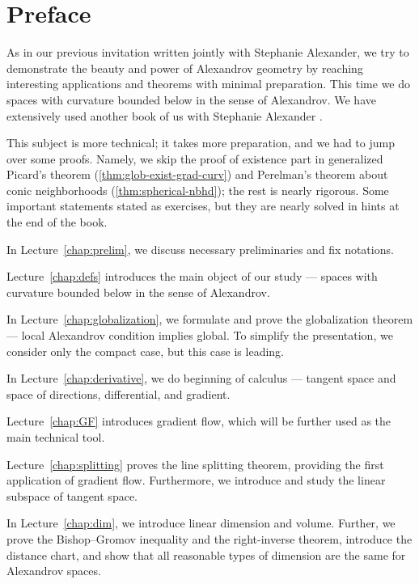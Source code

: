 \chapter*{Preface}

As in our previous invitation \cite{alexander-kapovitch-petrunin-2019} written jointly with Stephanie Alexander,
we try to demonstrate the beauty and power of Alexandrov geometry by reaching interesting applications and theorems with minimal preparation.
This time we do spaces with curvature bounded below in the sense of Alexandrov.
We have extensively used another book of us with Stephanie Alexander \cite{alexander-kapovitch-petrunin2024}.

This subject is more technical; it takes more preparation, and we had to jump over some proofs.
Namely, we skip the proof of existence part in generalized Picard's theorem (\ref{thm:glob-exist-grad-curv})
and Perelman's theorem about conic neighborhoods (\ref{thm:spherical-nbhd});
the rest is nearly rigorous.
Some important statements stated as exercises, but they are nearly solved in hints at the end of the book.

\medskip 

In Lecture~\ref{chap:prelim}, we discuss necessary preliminaries and fix notations.

Lecture~\ref{chap:defs} introduces the main object of our study --- spaces with curvature bounded below in the sense of Alexandrov.

In Lecture~\ref{chap:globalization}, we formulate and prove the globalization theorem --- local Alexandrov condition implies global.
To simplify the presentation, we consider only the compact case, but this case is leading.

In Lecture~\ref{chap:derivative}, we do beginning of calculus --- tangent space and space of directions, differential, and gradient.

Lecture~\ref{chap:GF} introduces gradient flow, which will be further used as the main technical tool.

Lecture~\ref{chap:splitting} proves the line splitting theorem, providing the first application of gradient flow.
Furthermore, we introduce and study the linear subspace of tangent space.

In Lecture~\ref{chap:dim}, we introduce linear dimension and volume.
Further, we prove the Bishop--Gromov inequality and the right-inverse theorem,
introduce the distance chart, and show that all reasonable types of dimension are the 
same for Alexandrov spaces.

